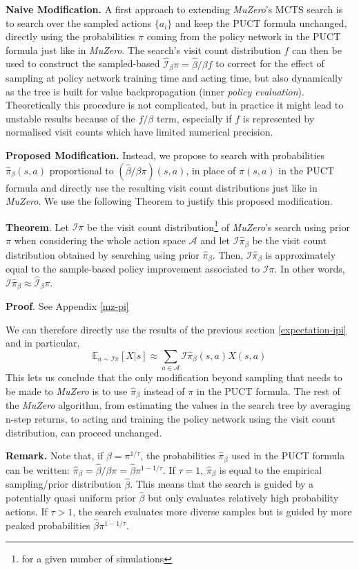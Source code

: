 \documentclass{article}
\newcommand{\muzero}{\emph{MuZero}}
\newcommand{\ipi}{\mathcal{I}\pi}
\newcommand{\sample}{\beta}
\newcommand{\ibpi}{\hat{\mathcal{I}}_{\sample}\pi}
\newcommand{\ihpi}{\mathcal{I}\hat{\pi}_\sample}
\begin{document}
\textbf{Naive Modification.}
A first approach to extending \muzero{}'s MCTS search is to search over the sampled actions $\{a_i\}$ and keep the PUCT formula unchanged, directly using the probabilities $\pi$ coming from the policy network in the PUCT formula just like in \muzero{}. The search's visit count distribution $f$ can then be used to construct the sampled-based $\ibpi = \hat{\sample}/\sample f$ to correct for the effect of sampling at policy network training time and acting time, but also dynamically as the tree is built for value backpropagation (inner \emph{policy evaluation}). Theoretically this procedure is not complicated, but in practice it might lead to unstable results because of the $f/\sample$ term, especially if $f$ is represented by normalised visit counts which have limited numerical precision.

\textbf{Proposed Modification.}
Instead, we propose to search with probabilities $\hat{\pi}_\sample(s, a)$ proportional to $(\hat{\sample}/\sample \pi)(s,a)$, in place of $\pi(s, a)$ in the PUCT formula and directly use the resulting visit count distributions just like in \muzero{}. We use the following Theorem to justify this proposed modification.

\textbf{Theorem}.
Let $\ipi$ be the visit count distribution\footnote{for a given number of simulations} of \muzero{}'s search using prior $\pi$ when considering the whole action space $\mathcal{A}$ and let $\ihpi$ be the visit count distribution obtained by searching using prior $\hat{\pi}_\sample$. Then, $\ihpi$ is approximately equal to the sample-based policy improvement associated to $\ipi$. In other words, $\ihpi \approx \ibpi$.

\textbf{Proof}. See Appendix \ref{mz-pi}

We can therefore directly use the results of the previous section \ref{expectation-ipi} and in particular,
$$
\mathbb{E}_{a\sim\ipi}[X|s] \approx \sum_{a\in\mathcal{A}}\ihpi(s, a) X(s,a)
$$
This lets us conclude that the only modification beyond sampling that needs to be made to \muzero{} is to use $\hat{\pi}_\sample$ instead of $\pi$ in the PUCT formula. The rest of the \muzero{} algorithm, from estimating the values in the search tree by averaging n-step returns, to acting and training the policy network using the visit count distribution, can proceed unchanged.

\textbf{Remark.} Note that, if $\sample=\pi^{1/\tau}$, the probabilities $\hat{\pi}_\sample$ used in the PUCT formula can be written: $\hat{\pi}_\sample=\hat{\sample}/\sample \pi= \hat{\sample} \pi^{1-1/\tau}$. If $\tau=1$, $\hat{\pi}_\sample$ is equal to the empirical sampling/prior distribution $\hat{\sample}$. This means that the search is guided by a potentially quasi uniform prior $\hat{\sample}$ but only evaluates relatively high probability actions. If $\tau>1$, the search evaluates more diverse samples but is guided by more peaked probabilities $\hat{\sample} \pi^{1-1/\tau}$.
\end{document}
